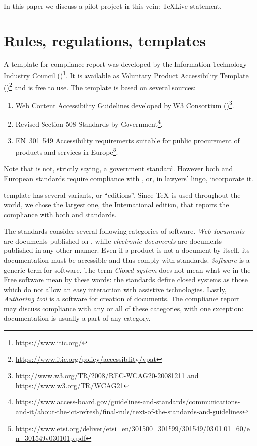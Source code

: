 \documentclass{ltugboat}
\begin{document}
In this paper we discuss a pilot project in this vein:  \TeX Live
\textsuperscript{\textregistered} statement.

\section{Rules, regulations, templates}
\label{sec:rules}

A template for compliance report was developed by the Information
Technology Industry Council
()\footnote{\url{https://www.itic.org/}}.  It is available as
Voluntary Product Accessibility Template
(\textsuperscript{\textregistered})\footnote{\url{https://www.itic.org/policy/accessibility/vpat}}
and is free to use.  The template is based on several sources:
\begin{enumerate}
\item Web Content Accessibility Guidelines developed by W3 Consortium
  ()\footnote{\url{http://www.w3.org/TR/2008/REC-WCAG20-20081211}
    and \url{https://www.w3.org/TR/WCAG21}}.
\item Revised Section 508 Standards by 
  Government\footnote{\url{https://www.access-board.gov/guidelines-and-standards/communications-and-it/about-the-ict-refresh/final-rule/text-of-the-standards-and-guidelines}}.
\item EN~301~549 Accessibility requirements suitable for public
  procurement of  products and services in
  Europe\footnote{\url{https://www.etsi.org/deliver/etsi_en/301500_301599/301549/03.01.01_60/en_301549v030101p.pdf}}.
\end{enumerate}
Note that  is not, strictly saying, a government standard.
However both  and European standards require compliance with
, or, in lawyers' lingo, incorporate it.  

 template has several variants, or ``editions''.  Since
\TeX\ is used throughout the world, we chose the largest one, the
International edition, that reports the compliance with both 
and  standards.

The standards consider several following categories of software.
\emph{Web documents} are documents published on , while
\emph{electronic documents} are documents published in any other
manner.  Even if a product is not a document by itself, its
documentation must be accessible and thus comply with 
standards.  \emph{Software} is a generic term for software. The term
\emph{Closed system} does not mean what we in the Free software mean
by these words: the standards define closed systems as those which do
not allow an easy interaction with assistive technologies.  Lastly,
\emph{Authoring tool} is a software for creation of documents.  The
compliance report may discuss compliance with any or all of these
categories, with one exception: documentation is usually a part of any
category.
\end{document}
